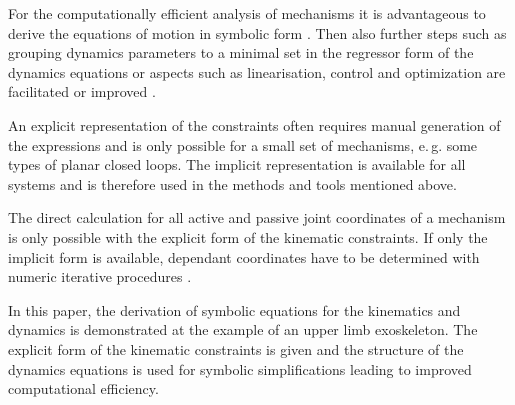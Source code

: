 \documentclass[letterpaper, 10 pt, conference]{ieeeconf}  %
\begin{document}
For the computationally efficient analysis of mechanisms it is advantageous to derive the equations of motion in symbolic form \cite{SaminFis2013}.
Then also further steps such as grouping dynamics parameters to a minimal set  in the regressor form of the dynamics equations \cite{KhalilBen1995} or aspects such as linearisation, control and optimization are facilitated or improved \cite{ParkChoPlo1999}.


An explicit representation of the constraints often requires manual generation of the expressions and is only possible for a small set of mechanisms, e.\,g. some types of planar closed loops.
The implicit representation is available for all systems and is therefore used in the methods and tools mentioned above.


The direct calculation for all active and passive joint coordinates of a mechanism is only possible with the explicit form of the kinematic constraints.
If only the implicit form is available, dependant coordinates have to be determined with numeric iterative procedures \cite{ParkChoPlo1999}.

In this paper, the derivation of symbolic equations for the kinematics and dynamics is demonstrated at the example of an upper limb exoskeleton.
The explicit form of the kinematic constraints is given and the structure of the dynamics equations is used for symbolic simplifications leading to improved computational efficiency.
\end{document}

